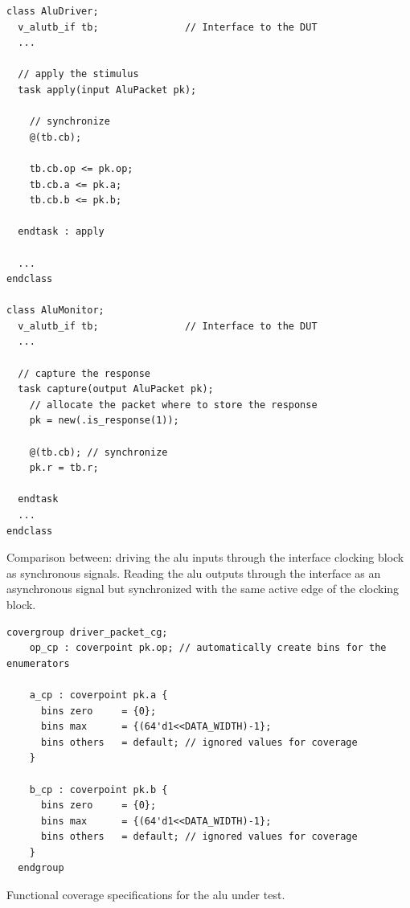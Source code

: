 \begin{listing}
\begin{verbatim}
class AluDriver;
  v_alutb_if tb;               // Interface to the DUT
  ...
  
  // apply the stimulus
  task apply(input AluPacket pk);

    // synchronize
    @(tb.cb);

    tb.cb.op <= pk.op;
    tb.cb.a <= pk.a;
    tb.cb.b <= pk.b;

  endtask : apply

  ...
endclass

class AluMonitor;
  v_alutb_if tb;               // Interface to the DUT
  ...
  
  // capture the response
  task capture(output AluPacket pk);
    // allocate the packet where to store the response
    pk = new(.is_response(1));

    @(tb.cb); // synchronize
    pk.r = tb.r;

  endtask
  ...
endclass
\end{verbatim}
\caption{Comparison between: driving the \ac{alu} inputs through the interface clocking block as synchronous signals. Reading the \ac{alu} outputs through the interface as an asynchronous signal but synchronized with the same active edge of the clocking block.}
\label{list:alu_cb}
\end{listing}

\begin{listing}
\begin{verbatim}
covergroup driver_packet_cg;
    op_cp : coverpoint pk.op; // automatically create bins for the enumerators

    a_cp : coverpoint pk.a {
      bins zero     = {0};
      bins max      = {(64'd1<<DATA_WIDTH)-1};
      bins others   = default; // ignored values for coverage
    }

    b_cp : coverpoint pk.b {
      bins zero     = {0};
      bins max      = {(64'd1<<DATA_WIDTH)-1};
      bins others   = default; // ignored values for coverage
    }
  endgroup
\end{verbatim}
\caption{Functional coverage specifications for the \ac{alu} under test.}
\label{list:alu_cg}
\end{listing}


